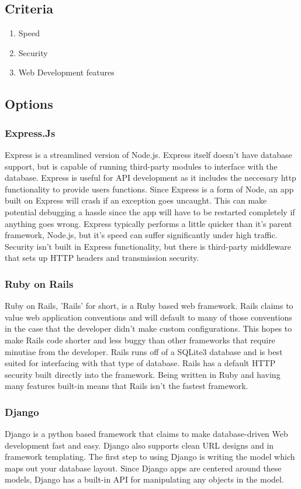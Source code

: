 \documentclass[onecolumn, draftclsnofoot,10pt, compsoc]{IEEEtran}
\begin{document}
\begin{singlespace}
\subsection{Criteria}
\begin{enumerate}
	\item Speed
	\item Security
	\item Web Development features
\end{enumerate}
\subsection{Options}
\subsubsection{Express.Js}
Express is a streamlined version of Node.js.
Express itself doesn't have database support, but is capable of running third-party modules to interface with the database.
Express is useful for API development as it includes the neccesary http functionality to provide users functions.
Since Express is a form of Node, an app built on Express will crash if an exception goes uncaught. This can make potential debugging a hassle since the app will have to be restarted completely if anything goes wrong.
Express typically performs a little quicker than it's parent framework, Node.js, but it's speed can suffer significantly under high traffic.
Security isn't built in Express functionality, but there is third-party middleware that sets up HTTP headers and transmission security.
\cite{Express}
\subsubsection{Ruby on Rails}
Ruby on Rails, 'Rails' for short, is a Ruby based web framework.
Rails claims to value web application conventions and will default to many of those conventions in the case that the developer didn't make custom configurations.
This hopes to make Rails code shorter and less buggy than other frameworks that require minutiae from the developer.
Rails runs off of a SQLite3 database and is best suited for interfacing with that type of database.
Rails has a default HTTP security built directly into the framework.
Being written in Ruby and having many features built-in means that Rails isn't the fastest framework.
\cite{Rails}
\subsubsection{Django}
Django is a python based framework that claims to make database-driven Web development fast and easy.
Django also supports clean URL designs and in framework templating.
The first step to using Django is writing the model which maps out your database layout.
\cite{DjangoStart}
Since Django apps are centered around these models, Django has a built-in API for manipulating any objects in the model.
\cite{DjangoOver}

\end{singlespace}
\end{document}
